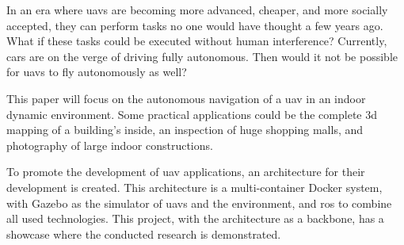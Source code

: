 In an era where \acsp{uav} are becoming more advanced, cheaper, and more socially accepted, they can perform tasks no one would have thought a few years ago. What if these tasks could be executed without human interference? Currently, cars are on the verge of driving fully autonomous. Then would it not be possible for \acsp{uav} to fly autonomously as well?

This paper will focus on the autonomous navigation of a \acs{uav} in an indoor dynamic environment. Some practical applications could be the complete \acs{3d} mapping of a building's inside, an inspection of huge shopping malls, and photography of large indoor constructions. \cite{spiral_robotics}

To promote the development of \acs{uav} applications, an architecture for their development is created. This architecture is a multi\hyp{}container Docker system, with Gazebo as the simulator of \acsp{uav} and the environment, and \acs{ros} to combine all used technologies. This project, with the architecture as a backbone, has a showcase where the conducted research is demonstrated.